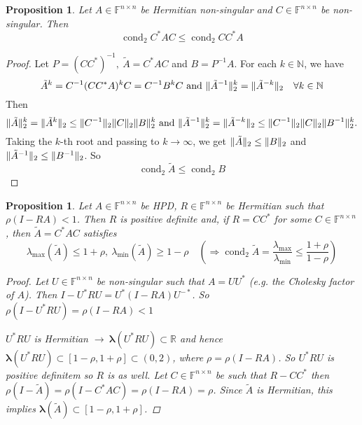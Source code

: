\documentclass[12pt]{article}
\newcounter{lecture}
\newtheorem{proposition}[theorem]{Proposition}
\theoremstyle{definition}
\theoremstyle{remark}
\numberwithin{equation}{section}
\newcommand{\F}{\mathbb{F}}
\newcommand{\R}{\mathbb{R}}
\newcommand{\N}{\mathbb{N}}
\newcommand{\spectrum}[1]{\bm{\lambda}(#1)}
\DeclarePairedDelimiter{\norm}{\lVert}{\rVert}
\DeclareMathOperator{\cond}{cond}
\begin{document}
\begin{proposition}
  Let $A \in \F^{n\times n}$ be Hermitian non-singular and $C \in \F^{n\times n}$ be non-singular. Then
  \begin{equation*}
    \cond_2 C^* A C \leq \cond_2 C C^* A
  \end{equation*}
\end{proposition}
\begin{proof}
  Let $P = (CC^*)^{-1},\ \tilde{A} = C^* A C$ and $B = P^{-1} A$. For each $k \in \N$, we have
  \begin{equation*}
    \tilde{A}^k = C^{-1} (CC^*A)^k C = C^{-1} B^k C \text{ and } \norm{\tilde{A}^{-1}}^k_2 = \norm{\tilde{A}^{-k}}_2 \quad \forall k \in \N
  \end{equation*}
  Then
  \begin{equation*}
    \norm{\tilde{A}}_2^k = \norm{\tilde{A}^k}_2 \leq \norm{C^{-1}}_2\norm{C}_2 \norm{B}_2^k\text{ and }\norm{\tilde{A}^{-1}}_2^k = \norm{\tilde{A}^{-k}}_2 \leq \norm{C^{-1}}_2\norm{C}_2 \norm{B^{-1}}_2^k.
  \end{equation*}
  Taking the $k$-th root and passing to $k \rightarrow \infty$, we get $\norm{\tilde{A}}_2 \leq \norm{B}_2$ and $\norm{\tilde{A}^{-1}}_2 \leq \norm{B^{-1}}_2$. So
  \begin{equation*}
    \cond_2 \tilde{A} \leq \cond_2 B
  \end{equation*}
\end{proof}
\begin{proposition}
  Let $A \in \F^{n\times n}$ be HPD, $R \in \F^{n\times n}$ be Hermitian such that $\rho(I-RA) < 1$. Then $R$ is positive definite and, if $R = CC^*$ for some $C \in \F^{n\times n}$, then $\tilde{A} = C^* A C$ satisfies
  \begin{equation*}
    \lambda_{\max}(\tilde{A})\leq 1 + \rho,\ \lambda_{\min}(\tilde{A}) \geq 1 - \rho \quad (\Rightarrow \cond_2 \tilde{A} = \frac{\lambda_{\max}}{\lambda_{\min}} \leq \frac{1+\rho}{1-\rho})
  \end{equation*}
  \begin{proof}
    Let $U \in \F^{n\times n}$ be non-singular such that $A = UU^*$ (e.g. the Cholesky factor of $A$). Then $I - U^*RU = U^*(I-RA)U^{-*}$. So $\rho(I-U^*RU) = \rho(I-RA) < 1$

    $U^*RU$ is Hermitian $\rightarrow\ \spectrum{U^*RU} \subset \R$ and hence $\spectrum{U^*RU} \subset [1-\rho, 1+\rho] \subset (0,2)$, where $\rho = \rho(I-RA)$. So $U^*RU$ is positive definitem so $R$ is as well. Let $C \in \F^{n\times n}$ be such that $R - CC^*$ then $\rho(I-\tilde{A}) = \rho(I-C^*A C) = \rho(I - RA) =\rho$. Since $\tilde{A}$ is Hermitian, this implies $\spectrum{\tilde{A}} \subset [1-\rho, 1+\rho]$.
  \end{proof}
\end{proposition}
\end{document}
